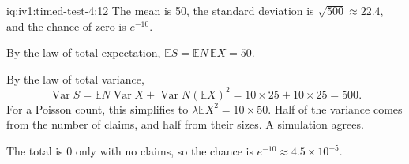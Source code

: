 \begin{solution}{iq:iv1:timed-test-4:12}
The mean is 50, the standard deviation is $\sqrt{500} \approx 22.4$, and the chance of zero is $e^{-10}$.

By the law of total expectation, $\mathbb{E}S = \mathbb{E}N\,\mathbb{E}X = 50$.

By the law of total variance,
\[
\operatorname{Var}S = \mathbb{E}N\operatorname{Var}X + \operatorname{Var}N(\mathbb{E}X)^2 = 10 \times 25 + 10 \times 25 = 500.
\]
For a Poisson count, this simplifies to $\lambda\mathbb{E}X^2 = 10 \times 50$. Half of the variance comes from the number of claims, and half from their sizes. A simulation agrees.

The total is 0 only with no claims, so the chance is $e^{-10} \approx 4.5 \times 10^{-5}$.


\end{solution}

